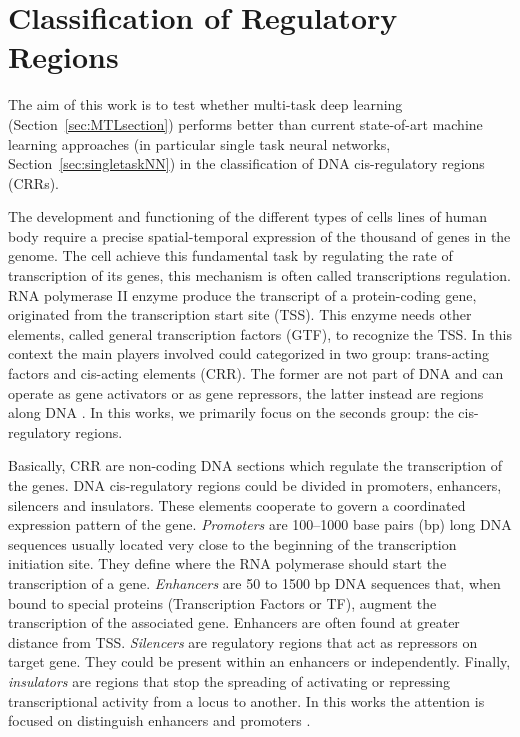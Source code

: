 \section{Classification of Regulatory Regions}
The aim of this work is to test whether multi-task deep learning (Section~\ref{sec:MTLsection}) performs better than current state-of-art
machine learning approaches (in particular single task neural networks, Section~\ref{sec:singletaskNN}) in the classification of DNA cis-regulatory regions (CRRs). 

The development and functioning of the different types of cells lines of human body require a precise spatial-temporal expression of the thousand of genes in the genome. The cell achieve this fundamental task by regulating the rate of transcription of its genes, this mechanism is often called transcriptions regulation. 
RNA polymerase II enzyme produce the transcript of a protein-coding gene, originated from the transcription start site (TSS). This enzyme needs other elements, called general transcription factors (GTF), to recognize the TSS. In this context the main players involved could categorized in two group: trans-acting factors and cis-acting elements (CRR). The former are not part of DNA and can operate as gene activators or as gene repressors, the latter instead are regions along DNA \cite{NarlikarRegulaotryelements}. In this works, we primarily focus on the seconds group: the cis-regulatory regions.

Basically, CRR are non-coding DNA sections which
regulate the transcription of the genes. 
DNA cis-regulatory regions could be divided in promoters, enhancers, silencers and insulators. These elements cooperate to govern a coordinated expression pattern of the gene.  
\emph{Promoters} are 100–1000 base pairs (bp) long DNA sequences
usually located very close to the beginning of the transcription initiation site. They define where the RNA polymerase should start the transcription of a gene. 
\emph{Enhancers} are 50 to 1500 bp DNA sequences that, when bound to special proteins (Transcription Factors or TF), augment the transcription of the associated gene. Enhancers are often found at greater distance from TSS.
\emph{Silencers} are regulatory regions that act as repressors on target gene. They could be present within an enhancers or independently. 
Finally, \emph{insulators} are regions that stop the spreading of activating or repressing transcriptional activity from a locus to another. In this works the attention is focused on distinguish enhancers and promoters \cite{NarlikarRegulaotryelements}. 

